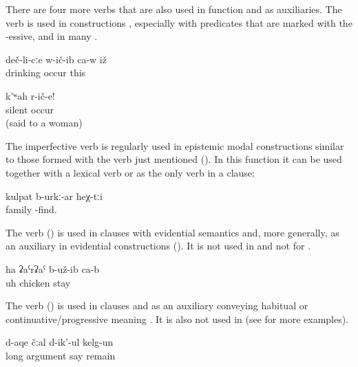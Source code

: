There are four more verbs that are also used in  function and as auxiliaries. The verb   is used in  constructions , especially with predicates that are marked with the -essive, and in many  .
%
\begin{exe}
	\ex	\label{ex:He became a drinker}
	\gll	deč-li-cːe	w-ič-ib	ca-w	iž\\
		drinking	occur		this\\
	\glt	{}

	\ex	\label{ex:Be silent}
	\gll	k'ʷah	r-ič-e!\\
		silent	occur\\
	\glt	{} (said to a woman)
\end{exe}

The imperfective verb   is regularly used in epistemic modal constructions similar to those formed with the verb   just mentioned (). In this function it can be used together with a lexical verb or as the only verb in a  clause: 

\begin{exe}
	\ex	\label{They are probably a family.COP}
	\gll	kulpat	b-urkː-ar			heχ-tːi\\
		family	-find.	\\
	\glt	{}
\end{exe}

The verb  ()  is used in  clauses with evidential semantics  and, more generally, as an auxiliary in evidential constructions (). It is not used in  and not for .
%
\begin{exe}
	\ex	\label{ex:Ah, it turned out to be a chicken}
	\gll	ha	ʡaˁrʡaˁ	b-už-ib	ca-b\\
		uh	chicken	stay	\\
	\glt	{}
\end{exe}

The verb  ()  is used in  clauses and as an auxiliary conveying habitual or continuative\slash progressive meaning . It is also not used in  (see  for more examples).
%
\begin{exe}
	\ex	\label{ex:‎‎They were arguing for a long time}
	\gll	d-aqe	čːal	d-ik'-ul	kelg-un\\
		long	argument	say	remain\\
	\glt	{}
\end{exe}
